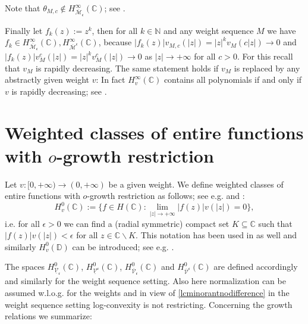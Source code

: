 \documentclass[10pt]{amsart}%
\numberwithin{equation}{section}
\theoremstyle{plain}
\newcommand{\CC}{\mathbb{C}}
\newcommand{\NN}{\mathbb{N}}
\begin{document}
Note that $\theta_{M,c}\notin H^{\infty}_{\overline{\mathcal{M}}_{\mathfrak{c}}}(\CC)$; see \cite[Rem. 3.11]{weightedentirecharacterization}.\vspace{6pt}

Finally let $f_k(z):=z^k$, then for all $k\in\NN$ and any weight sequence $M$ we have $f_k\in H^{\infty}_{\overline{\mathcal{M}}_{\mathfrak{c}}}(\CC), H^{\infty}_{\overline{\mathcal{M}}^{\mathfrak{c}}}(\CC)$, because $|f_k(z)|v_{M,c}(|z|)=|z|^kv_M(c|z|)\rightarrow 0$ and $|f_k(z)|v^c_M(|z|)=|z|^kv^c_M(|z|)\rightarrow 0$ as $|z|\rightarrow+\infty$ for all $c>0$. For this recall that $v_M$ is rapidly decreasing. The same statement holds if $v_M$ is replaced by any abstractly given weight $v$: In fact $H_v^{\infty}(\CC)$ contains all polynomials if and only if $v$ is rapidly decreasing; see \cite[p. 3]{Bonet2022survey}.

\section{Weighted classes of entire functions with $o$-growth restriction}\label{equsectforo}
Let $v:[0,+\infty)\rightarrow(0,+\infty)$ be a given weight. We define weighted classes of entire functions with $o$-growth restriction as follows; see e.g. \cite[Sect. 1.B]{BierstedtBonetTaskinen98} and \cite{BonetDomanskiLindstroemTaskinen98}:
$$H^{0}_v(\CC):=\{f\in H(\CC): \lim_{|z|\rightarrow+\infty}|f(z)|v(|z|)=0\},$$
i.e. for all $\epsilon>0$ we can find a (radial symmetric) compact set $K\subseteq\CC$ such that $|f(z)|v(|z|)<\epsilon$ for all $z\in\CC\backslash K$. This notation has been used in \cite{Bonet2022survey} as well and similarly $H^{0}_v(\mathbb{D})$ can be introduced; see e.g. \cite{BonetDomanskiLindstroemTaskinen98}.

The spaces $H^{0}_{\underline{\mathcal{V}}_{\mathfrak{c}}}(\CC)$, $H^{0}_{\underline{\mathcal{V}}^{\mathfrak{c}}}(\CC)$, $H^{0}_{\overline{\mathcal{V}}_{\mathfrak{c}}}(\CC)$ and $H^{0}_{\overline{\mathcal{V}}^{\mathfrak{c}}}(\CC)$ are defined accordingly and similarly for the weight sequence setting. Also here normalization can be assumed w.l.o.g. for the weights and in view of \eqref{lcminorantnodifference} in the weight sequence setting log-convexity is not restricting. Concerning the growth relations we summarize:\vspace{6pt}
\end{document}
